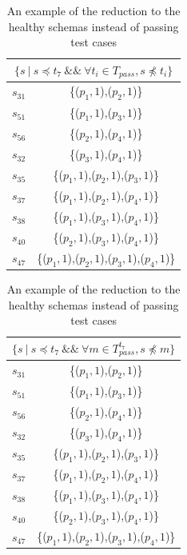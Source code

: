  \begin{table}[htbp]
  \centering
  \caption{An example of the reduction to the healthy schemas instead of passing test cases}
  \label{ex:healthyintequal}
    \begin{tabular}{|c|c|} \hline
     \multicolumn{2}{|c|}{$\{ s\ |\ s \preceq t_{7}\ \&\&\  \forall t_{i} \in T_{pass}, s \npreceq t_{i} \} $} \\ \hline
   $s_{31}$ & \{($p_{1}, 1$),($p_{2}, 1$)\} \\
   $s_{51}$ & \{($p_{1}, 1$),($p_{3}, 1$)\} \\
   $s_{56}$ & \{($p_{2}, 1$),($p_{4}, 1$)\} \\
   $s_{32}$ & \{($p_{3}, 1$),($p_{4}, 1$)\} \\

   $s_{35}$ & \{($p_{1}, 1$),($p_{2}, 1$),($p_{3}, 1$)\} \\
   $s_{37}$ & \{($p_{1}, 1$),($p_{2}, 1$),($p_{4}, 1$)\} \\
   $s_{38}$ & \{($p_{1}, 1$),($p_{3}, 1$),($p_{4}, 1$)\} \\
   $s_{40}$ & \{($p_{2}, 1$),($p_{3}, 1$),($p_{4}, 1$)\} \\

   $s_{47}$ & \{($p_{1}, 1$),($p_{2}, 1$),($p_{3}, 1$),($p_{4}, 1$)\} \\ \hline
    \end{tabular}%
\quad
    \begin{tabular}{|c|c|} \hline
   \multicolumn{2}{|c|}{$\{ s\ |\ s \preceq t_{7}\ \&\&\ \forall m \in T_{pass}^{t_{7}}, s \npreceq m \}$}\\ \hline
   $s_{31}$ & \{($p_{1}, 1$),($p_{2}, 1$)\} \\
   $s_{51}$ & \{($p_{1}, 1$),($p_{3}, 1$)\} \\
   $s_{56}$ & \{($p_{2}, 1$),($p_{4}, 1$)\} \\
   $s_{32}$ & \{($p_{3}, 1$),($p_{4}, 1$)\} \\

   $s_{35}$ & \{($p_{1}, 1$),($p_{2}, 1$),($p_{3}, 1$)\} \\
   $s_{37}$ & \{($p_{1}, 1$),($p_{2}, 1$),($p_{4}, 1$)\} \\
   $s_{38}$ & \{($p_{1}, 1$),($p_{3}, 1$),($p_{4}, 1$)\} \\
   $s_{40}$ & \{($p_{2}, 1$),($p_{3}, 1$),($p_{4}, 1$)\} \\

   $s_{47}$ & \{($p_{1}, 1$),($p_{2}, 1$),($p_{3}, 1$),($p_{4}, 1$)\} \\ \hline
    \end{tabular}%
\end{table}


